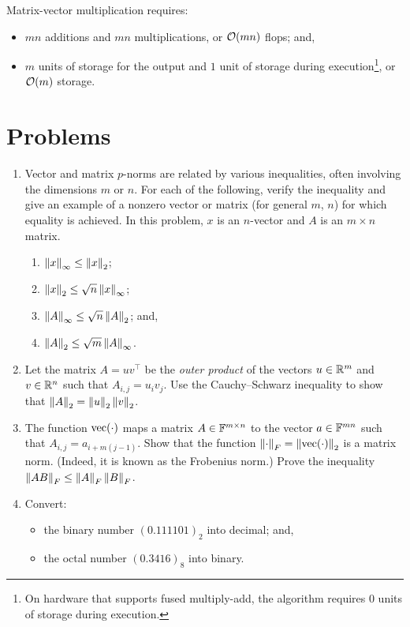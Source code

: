 Matrix-vector multiplication requires:
\begin{itemize}
\item $mn$ additions and $mn$ multiplications, or $\mathcal{O}(mn)$ flops; and,
\item $m$ units of storage for the output and $1$ unit of storage during execution\footnote{On hardware that supports fused multiply-add, the algorithm requires $0$ units of storage during execution.}, or $\mathcal{O}(m)$ storage.
\end{itemize}

\section{Problems}

\begin{enumerate}

\item Vector and matrix $p$-norms are related by various inequalities, often involving the dimensions $m$ or $n$. For each of the following, verify the inequality and give an example of a nonzero vector or matrix (for general $m$, $n$) for which equality is achieved. In this problem, $x$ is an $n$-vector and $A$ is an $m\times n$ matrix.
\begin{enumerate}
\item $\left\|{x}\right\|_\infty \le \left\|{x}\right\|_2$;
\item $\left\|{x}\right\|_2 \le \sqrt{n}\left\|{x}\right\|_\infty$;
\item $\left\|{A}\right\|_\infty \le \sqrt{n}\left\|{A}\right\|_2$; and,
\item $\left\|{A}\right\|_2 \le \sqrt{m}\left\|{A}\right\|_\infty$.
\end{enumerate}

\item Let the matrix $A = uv^\top$ be the {\em outer product} of the vectors $u\in\mathbb{R}^m$ and $v\in\mathbb{R}^n$ such that $A_{i,j} = u_iv_j$. Use the Cauchy--Schwarz inequality to show that $\left\|{A}\right\|_2 = \left\|{u}\right\|_2\left\|{v}\right\|_2$.

\item The function $\operatorname{vec}(\cdot)$ maps a matrix $A\in\mathbb{F}^{m\times n}$ to the vector $a\in\mathbb{F}^{mn}$ such that $A_{i,j} = a_{i+m(j-1)}$. Show that the function $\left\|{\cdot}\right\|_F = \left\|{\operatorname{vec}(\cdot)}\right\|_2$ is a matrix norm. (Indeed, it is known as the Frobenius norm.) Prove the inequality $\left\|{AB}\right\|_F \le \left\|{A}\right\|_F\left\|{B}\right\|_F$.

\item Convert:
\begin{itemize}
\item the binary number $(0.111101)_2$ into decimal; and,
\item the octal number $(0.3416)_8$ into binary.
\end{itemize}


\end{enumerate}
